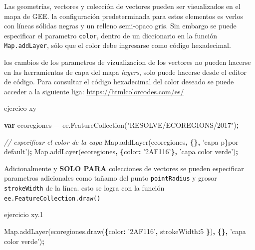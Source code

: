 \documentclass[
]{article}
\newenvironment{Shaded}{\begin{snugshade}}{\end{snugshade}}
\newcommand{\AttributeTok}[1]{\textcolor[rgb]{0.77,0.63,0.00}{#1}}
\newcommand{\CommentTok}[1]{\textcolor[rgb]{0.56,0.35,0.01}{\textit{#1}}}
\newcommand{\DataTypeTok}[1]{\textcolor[rgb]{0.13,0.29,0.53}{#1}}
\newcommand{\DecValTok}[1]{\textcolor[rgb]{0.00,0.00,0.81}{#1}}
\newcommand{\KeywordTok}[1]{\textcolor[rgb]{0.13,0.29,0.53}{\textbf{#1}}}
\newcommand{\NormalTok}[1]{#1}
\newcommand{\OperatorTok}[1]{\textcolor[rgb]{0.81,0.36,0.00}{\textbf{#1}}}
\newcommand{\StringTok}[1]{\textcolor[rgb]{0.31,0.60,0.02}{#1}}
\newcommand{\VariableTok}[1]{\textcolor[rgb]{0.00,0.00,0.00}{#1}}
\begin{document}
Las geometrías, vectores y colección de vectores pueden ser visualizados
en el mapa de GEE. la configuración predeterminada para estos elementos
es verlos con líneas sólidas negras y un relleno semi-opaco gris. Sin
embargo se puede especificar el parametro \texttt{color}, dentro de un
diccionario en la función \texttt{Map.addLayer}, sólo que el color debe
ingresarse como código hexadecimal.

\begin{tipblock}
los cambios de los parametros de vizualizacion de los vectores no pueden
hacerse en las herramientas de capa del mapa \emph{layers}, solo puede
hacerse desde el editor de código. Para consultar el código hexadecimal
del color deseado se puede acceder a la siguiente liga:
\url{https://htmlcolorcodes.com/es/}

\end{tipblock}

ejercico xy

\begin{Shaded}
\begin{Highlighting}[]
\KeywordTok{var}\NormalTok{ ecoregiones }\OperatorTok{=} \VariableTok{ee}\NormalTok{.}\AttributeTok{FeatureCollection}\NormalTok{(}\StringTok{"RESOLVE/ECOREGIONS/2017"}\NormalTok{)}\OperatorTok{;}

\CommentTok{// especificar el color de la capa }
\VariableTok{Map}\NormalTok{.}\AttributeTok{addLayer}\NormalTok{(ecoregiones}\OperatorTok{,} \OperatorTok{\{\},} \StringTok{'capa p\}por default'}\NormalTok{)}\OperatorTok{;}
\VariableTok{Map}\NormalTok{.}\AttributeTok{addLayer}\NormalTok{(ecoregiones}\OperatorTok{,} \OperatorTok{\{}\DataTypeTok{color}\OperatorTok{:} \StringTok{'2AF116'}\OperatorTok{\},} \StringTok{'capa color verde'}\NormalTok{)}\OperatorTok{;}
\end{Highlighting}
\end{Shaded}

Adicionalmente y \textbf{SOLO PARA} colecciones de vectores se pueden
especificar parametros adicionales como tañamo del punto
\texttt{pointRadius} y grosor \texttt{strokeWidth} de la línea. esto se
logra con la función \texttt{ee.FeatureCollection.draw()}

ejercicio xy.1

\begin{Shaded}
\begin{Highlighting}[]
\VariableTok{Map}\NormalTok{.}\AttributeTok{addLayer}\NormalTok{(}\VariableTok{ecoregiones}\NormalTok{.}\AttributeTok{draw}\NormalTok{(}\OperatorTok{\{}\DataTypeTok{color}\OperatorTok{:} \StringTok{'2AF116'}\OperatorTok{,} \DataTypeTok{strokeWidth}\OperatorTok{:}\DecValTok{5} \OperatorTok{\}}\NormalTok{)}\OperatorTok{,} \OperatorTok{\{\},} \StringTok{'capa color verde'}\NormalTok{)}\OperatorTok{;}
\end{Highlighting}
\end{Shaded}
\end{document}
